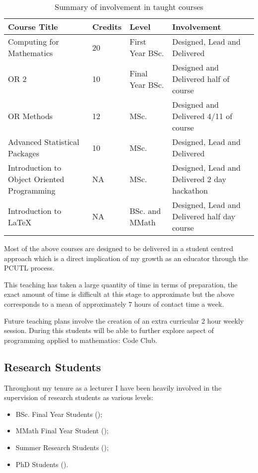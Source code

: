 \documentclass{article}
\begin{document}
\begin{table}[!htbp]
\begin{center}
\begin{tabular}{p{5cm}llp{6cm}}
\toprule
Course Title & Credits & Level & Involvement\\
\midrule
Computing for Mathematics & 20 &  First Year BSc. & Designed, Lead and Delivered\\
OR 2 & 10 &  Final Year BSc.  & Designed and Delivered half of course\\
OR Methods & 12 & MSc. & Designed and Delivered 4/11 of course\\
Advanced Statistical Packages & 10 &  MSc. & Designed, Lead and Delivered\\
Introduction to Object Oriented Programming & NA &  MSc. & Designed, Lead and Delivered 2 day hackathon\\
Introduction to \LaTeX & NA & BSc. and MMath & Designed, Lead and Delivered half day course\\
\bottomrule
\end{tabular}
\caption{Summary of involvement in taught courses}\label{tab:teaching}
\end{center}
\end{table}

Most of the above courses are designed to be delivered in a student centred approach which is a direct implication of my growth as an educator through the PCUTL process.

This teaching has taken a large quantity of time in terms of preparation, the exact amount of time is difficult at this stage to approximate but the above corresponds to a mean of approximately 7 hours of contact time a week.

Future teaching plans involve the creation of an extra curricular 2 hour weekly session. During this students will be able to further explore aspect of programming applied to mathematics: Code Club.

\subsection{Research Students}

Throughout my tenure as a lecturer I have been heavily involved in the supervision of research students as various levels:

\begin{itemize}
    \item BSc. Final Year Students ();
    \item MMath Final Year Student ();
    \item Summer Research Students ();
    \item PhD Students ().
\end{itemize}
\end{document}

